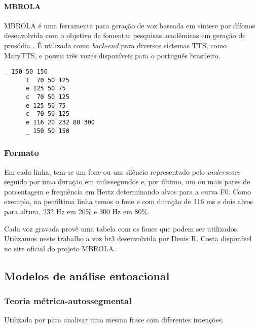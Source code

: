 \paragraph{MBROLA}
\label{sec:mbrola}
MBROLA é uma ferramenta para geração de voz baseada em síntese por dífonos
desenvolvida com o objetivo de fomentar pesquisas acadêmicas em geração de
prosódia \cite{mbrola}. É utilizada como \emph{back-end} para diversos sistemas
TTS, como MaryTTS, e possui três vozes disponíveis para o português brasileiro. %

\begin{lstlisting}[caption=Exemplo de arquivo de entrada para MBROLA]
      _ 150 50 150
      t  70 50 125
      e 125 50 75
      c  70 50 125
      e 125 50 75
      c  70 50 125
      e 116 20 232 80 300
      _ 150 50 150
\end{lstlisting}

\subsubsection{Formato}
Em cada linha, tem-se um fone ou um silêncio representado pelo \emph{underscore} seguido por uma duração em milissegundos e, por último, um ou mais pares de porcentagem e frequência em Hertz determinando alvos para a curva F0. Como exemplo, na penúltima linha temos o fone \/e\/ com duração de 116 ms e dois alvos para altura, 232 Hz em 20\% e 300 Hz em 80\%.

Cada voz gravada provê uma tabela com os fones que podem ser utilizados. Utilizamos neste trabalho a voz br3 desenvolvida por Denis R. Costa disponível no site oficial do projeto MBROLA.

\subsection{Modelos de análise entoacional}
\subsubsection{Teoria métrica-autossegmental}
Utilizada por  para analisar uma mesma frase com diferentes intenções.


